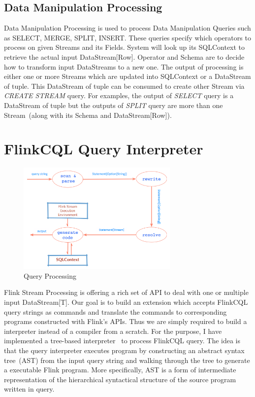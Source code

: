 \subsection{Data Manipulation Processing}
Data Manipulation Processing is used to process Data Manipulation Queries such as SELECT, MERGE, SPLIT, INSERT. These queries specify which operators to process on given Streams and its Fields. System will look up its SQLContext to retrieve the actual input DataStream[Row]. Operator and Schema are to decide how to transform input DataStreams to a new one. The output of processing is either one or more Streams which are updated into SQLContext or a DataStream of tuple. This DataStream of tuple can be consumed to create other Stream via \textit{CREATE STREAM} query. For examples, the output of \textit{SELECT} query is a DataStream of tuple but the outputs of \textit{SPLIT} query are more than one Stream~(along with its Schema and DataStream[Row]).

\section{FlinkCQL Query Interpreter}
\begin{figure}[h!] 
\centering    
\includegraphics[width=0.7\textwidth]{QueryProcessing}
\caption{Query Processing}
\label{fig:QueryProcessing}
\end{figure}


Flink Stream Processing is offering a rich set of API to deal with one or  multiple input DataStream[T]. Our goal is to build an extension which accepts FlinkCQL query strings as commands and translate the commands to  corresponding programs constructed with Flink's APIs. Thus we are simply required to build a interpreter instead of a compiler from a scratch. For the purpose, I have implemented a tree-based interpreter~\citep{Parr:2009} to process FlinkCQL query. The idea is that the query interpreter executes program by constructing an abstract syntax tree~(AST) from the input query string and walking through the tree to generate a executable Flink program. More specifically, AST is a form of intermediate representation of the hierarchical syntactical structure of the source program written in query.  
	

